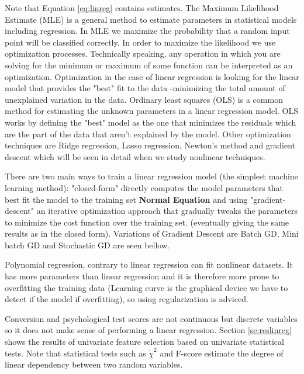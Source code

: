 \documentclass[11pt]{article}
\theoremstyle{definition}
\theoremstyle{remark}
\begin{document}
{Note that Equation \ref{eq:linreg} contains estimates. The Maximum Likelihood Estimate (MLE) is a general method to estimate parameters in statistical models including regression. In MLE we maximize the probability that a random input point will be classified correctly. In order to maximize the likelihood we use optimization processes. 
Technically speaking, any operation in which you are solving for the minimum or maximum of some function can be interpreted as an optimization. Optimization in the case of linear regression is looking for the linear model that provides the "best" fit to the data -minimizing the total amount of unexplained variation in the data.
Ordinary least squares (OLS) is a common method for estimating the unknown parameters in a linear regression model. OLS 
works by defining the "best" model as the one that minimizes the residuals which are the part of the data that aren't explained by the model. Other optimization techniques are Ridge regression, Lasso regression, Newton's method and gradient descent which will be seen in detail when we study nonlinear techniques.

There are two main ways to train a linear regression model (the simplest machine learning method): "closed-form" directly computes the model parameters that best fit the model to the training set \textbf{Normal Equation} and using "gradient-descent" an iterative optimization approach that gradually tweaks the parameters to minimize the cost function over the training set. (eventually giving the same results as in the closed form). Variations of Gradient Descent are Batch GD, Mini batch GD and Stochastic GD are seen bellow.

Polynomial regression, contrary to linear regression can fit nonlinear datasets. It has more parameters than linear regression and it is therefore more prone to overfitting the training data (Learning curve is the graphical device we have to detect if the model if overfitting), so using regularization is adviced.

Conversion and psychological test scores are not continuous but discrete variables so it does not make sense of performing a linear regression. Section \ref{se:reslinreg} shows the results of univariate feature selection based on univariate statistical tests. Note that statistical tests such as $\tilde{\chi}^2$ and F-score estimate the degree of linear dependency between two random variables.


}
\end{document}
